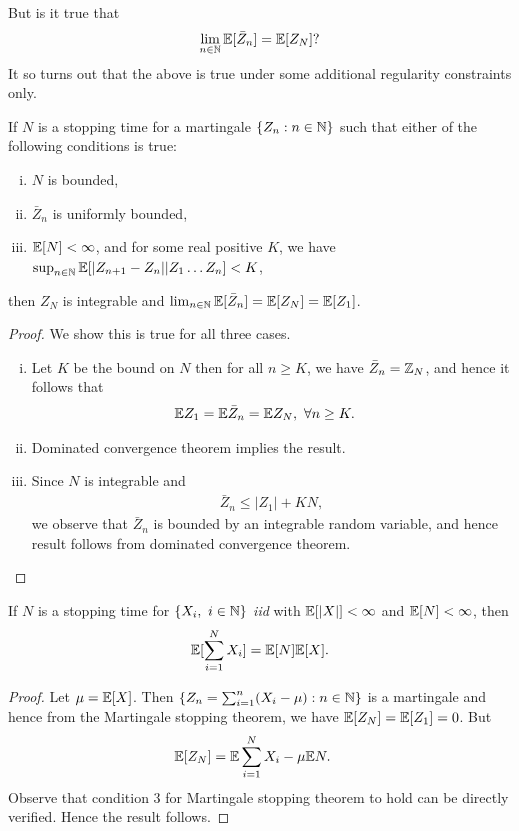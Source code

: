 \documentclass[a4paper,10pt,english]{article}
\begin{document}
But  is it true that
\begin{equation*}
\lim_{n \in \mathbb{N}}\mathbb{E}[\bar{Z}_n] = \mathbb{E}[Z_N]?
\end{equation*}
It so turns out that the above is true under some additional regularity constraints only. %
\begin{thm}
\label{MartStopThm}
If $N$ is a stopping time for a martingale $\{Z_n: n \in \mathbb{N}\}$ such that either of the following conditions is true:
\begin{enumerate}[(i)]
\item $N$ is bounded, 
\item $\bar{Z}_n$ is uniformly bounded,
\item $\mathbb{E}[N] < \infty$, and for some real positive $K$, we have $\sup_{n \in \mathbb{N}}\mathbb{E}[|Z_{n+1}-Z_n||Z_1 \hdots Z_n] < K$,
\end{enumerate}
then $Z_N$ is integrable and $\lim_{n \in \mathbb{N}}\mathbb{E}[\bar{Z}_n] = \mathbb{E}[Z_N]=\mathbb{E}[Z_1]$.
\end{thm}
\begin{proof} We show this is true for all three cases.
\begin{enumerate}[(i)] 
\item Let $K$ be the bound on $N$ then for all $n \geq K$, we have $\bar{Z}_n = \mathbb{Z}_N$, and hence it follows that
\begin{align*}
\mathbb{E} Z_1 = \mathbb{E}\bar{Z}_n &= \mathbb{E} Z_N, ~\forall n \geq K.
\end{align*}
\item Dominated convergence theorem implies the result. 
\item Since $N$ is integrable and  
\begin{align*} 
\bar{Z}_n \leq |Z_1| + K N,
\end{align*}
we observe that $\bar{Z}_n$ is bounded by an integrable random variable, and hence result follows from dominated convergence theorem.
\end{enumerate}
\end{proof}
\begin{cor} If $N$ is a stopping time for $\{X_i,~ i \in \mathbb{N}\}$ \textit{iid} with $\mathbb{E}[|X|]< \infty$ and $\mathbb{E}[N]< \infty$, then
\begin{align*}
\mathbb{E}[\sum_{i=1}^{N}X_i]=\mathbb{E}[N]\mathbb{E}[X].
\end{align*}
\end{cor}
\begin{proof}
Let $\mu=\mathbb{E}[X]$. Then $\{Z_n = \sum_{i=1}^{n}(X_i-\mu): n \in \mathbb{N}\}$ is a martingale and hence from the Martingale stopping theorem, we have $\mathbb{E}[Z_N]=\mathbb{E}[Z_1]=0$. But 
\begin{align*}
\E[Z_N] %
&=\E\sum_{i=1}^N X_i- \mu\E N.
\end{align*}
Observe that condition $3$  for Martingale stopping theorem to hold can be directly verified. Hence the result follows. 
\end{proof}
\end{document}
